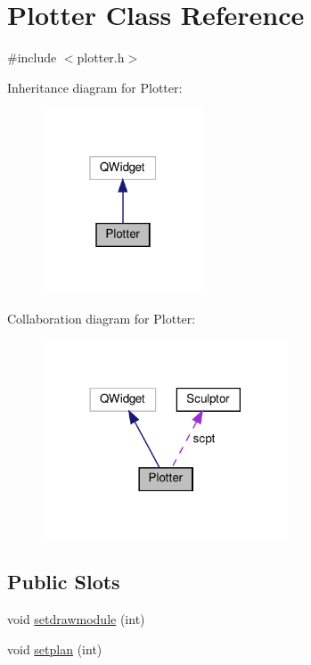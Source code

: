 \hypertarget{class_plotter}{}\section{Plotter Class Reference}
\label{class_plotter}


{\ttfamily \#include $<$plotter.\+h$>$}



Inheritance diagram for Plotter\+:
\nopagebreak
\begin{figure}[H]
\begin{center}
\leavevmode
\includegraphics[width=135pt]{class_plotter__inherit__graph}
\end{center}
\end{figure}


Collaboration diagram for Plotter\+:
\nopagebreak
\begin{figure}[H]
\begin{center}
\leavevmode
\includegraphics[width=206pt]{class_plotter__coll__graph}
\end{center}
\end{figure}
\subsection*{Public Slots}
\begin{DoxyCompactItemize}
\item 
void \hyperlink{class_plotter_a6f80702bdfaef06fc3c127bcf2e92b45}{setdrawmodule} (int)
\item 
void \hyperlink{class_plotter_aa2706e1b6da1cdde9c5dcfcf001215c1}{setplan} (int)
\end{DoxyCompactItemize}
